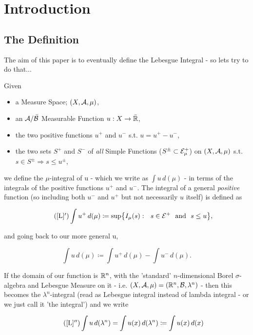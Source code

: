 \section{Introduction} \label{intro}
\subsection{The Definition} \label{def}

The aim of this paper is to eventually define the Lebesgue Integral - so lets try to do that...
\begin{definition}
	Given
	\begin{itemize}
		\item a Measure Space; $(X, \mathcal{A}, \mu)$,
		\item an $\mathcal{A}/\bar {\mathcal{B}}$ Measurable Function $u : X \rightarrow \bar {\mathbb{R}}$,
		\item the two positive functions $u^+$ and $u^-$ s.t. $u = u^+ - u^-$,
		\item the two sets $S^+$ and $S^-$ of {\em all} Simple Functions ($S^{\pm} \subset \mathcal{E}_\mu^+$) on $(X, \mathcal{A}, \mu)$ s.t. $s \in S^{\pm} \Rightarrow s \leq u^{\pm}$,
	\end{itemize}

	we define the $\mu$-integral of u - which we write as $\int u\,d(\mu)$ - in terms of the integrals of the positive functions $u^+$ and 			$u^-$. The integral of a general {\em positive} function (so including both $u^-$ and $u^+$ but not necessarily $u$ itself) is defined as

	\begin{equation*}\label{posint}\tag{\ref{L}$'$}
	\int u^+\,d(\mu) \coloneqq \sup\bigr\{ I_\mu(s) : \ \  s \in \E^+ \hbox{ \ and \ } s \le u \bigl\},
	\end{equation*}

	and going back to our more general u, 

	\begin{equation}\label{L}
	\int u\,d(\mu) \coloneqq \int u^+\,d(\mu) - \int u^-\,d(\mu).
	\end{equation}

	If the domain of our function is $\mathbb{R}^n$, with the 'standard' $n$-dimensional Borel $\sigma$-algebra and Lebesgue Measure on it - i.e. $(X, \mathcal{A}, \mu) 	= (\mathbb{R}^n, \mathcal{B}, \lambda^n)$ - then this becomes the $\lambda^n$-integral (read as Lebesgue integral instead of lambda integral - or we just 			call it 'the integral') and we write

	\begin{equation*} \tag{\ref{L}$''$}
	\int u\,d(\lambda^n) =  \int u(x)\,d(\Ln) \coloneqq \int u(x)\,d(x) 
	\end{equation*}
\end{definition}

